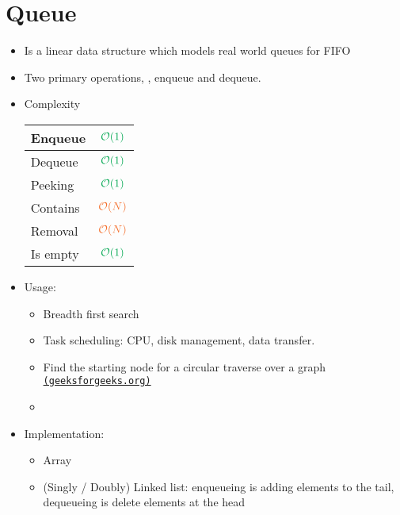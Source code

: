 \section{Queue}
\begin{itemize}
	\item Is a linear data structure which models real world queues for \ac{FIFO}
	\item Two primary operations, \ie, enqueue and dequeue.
	\item Complexity
	\begin{center}
		\begin{tabular}{|l|c|}
			\hline
			Enqueue & $ \color{Green} \mathcal{O}(1) $ \\ \hline
			Dequeue & $ \color{Green} \mathcal{O}(1) $ \\ \hline
			Peeking & $ \color{Green} \mathcal{O}(1) $ \\ \hline
			Contains & $ \color{Orange} \mathcal{O}(N) $ \\ \hline
			Removal & $ \color{Orange} \mathcal{O}(N) $ \\ \hline
			Is empty & $ \color{Green} \mathcal{O}(1) $ \\ \hline
		\end{tabular}
	\end{center}
	\item Usage:
	\begin{itemize}
		\item Breadth first search
		\item Task scheduling: CPU, disk management, data transfer. 
		\item Find the starting node for a circular traverse over a graph \href{https://www.geeksforgeeks.org/find-a-tour-that-visits-all-stations/}{\texttt{(geeksforgeeks.org)}}
		\item \etc
	\end{itemize}
	\item Implementation:
	\begin{itemize}
		\item Array
		\item (Singly / Doubly) Linked list: enqueueing is adding elements to the tail, dequeueing is delete elements at the head
	\end{itemize}
\end{itemize}


